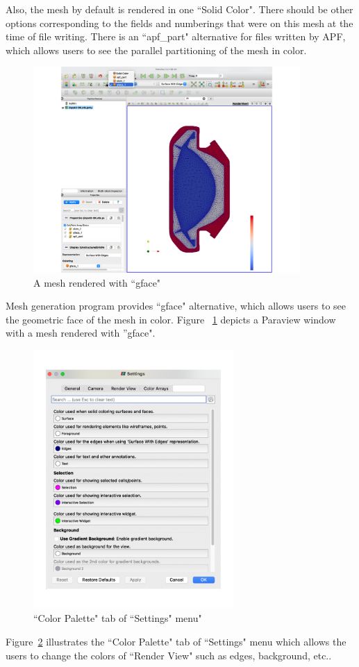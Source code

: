 Also, the mesh by default is rendered in one ``Solid Color".
There should be other options corresponding to the fields and numberings
that were on this mesh at the time of file writing.
There is an ``apf\_part" alternative for files written by APF, which
allows users to see the parallel partitioning of the mesh in color.

\begin{figure}
\centering
\includegraphics[width=4in]{./figures/paraview-fig5.pdf}
\caption{A mesh rendered with ``gface"}
\label{fig:paraview-5}
\end{figure}

Mesh generation program provides ``gface" alternative, which
allows users to see the geometric face of the mesh in color. 
Figure ~\ref{fig:paraview-5} depicts a Paraview window with a mesh rendered with ''gface".


\begin{figure}
\centering
\includegraphics[width=3in]{./figures/paraview-fig6.pdf}
\caption{``Color Palette" tab of ``Settings" menu"}
\label{fig:paraview-6}
\end{figure}
Figure~\ref{fig:paraview-6} illustrates the ``Color Palette" tab of ``Settings" menu which allows the users to change the colors of ``Render View" such as edges, background, etc.. 
